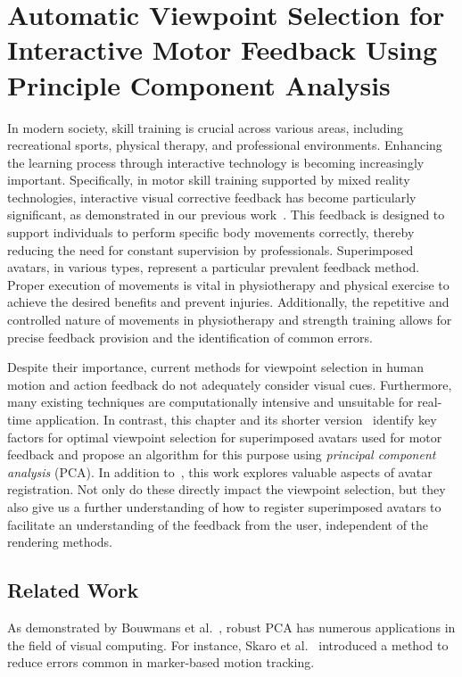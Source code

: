 
\chapter{Automatic Viewpoint Selection for Interactive Motor Feedback Using Principle Component Analysis\label{chap:viewpoint}}
In modern society, skill training is crucial across various areas, including recreational sports, physical therapy, and professional environments. Enhancing the learning process through interactive technology is becoming increasingly important. Specifically, in motor skill training supported by mixed reality technologies, interactive visual corrective feedback has become particularly significant, as demonstrated in our previous work~\cite{diller2022vcb}. This feedback is designed to support individuals to perform specific body movements correctly, thereby reducing the need for constant supervision by professionals. Superimposed avatars, in various types, represent a particular prevalent feedback method. Proper execution of movements is vital in physiotherapy and physical exercise to achieve the desired benefits and prevent injuries. Additionally, the repetitive and controlled nature of movements in physiotherapy and strength training allows for precise feedback provision and the identification of common errors.

Despite their importance, current methods for viewpoint selection in human motion and action feedback do not adequately consider visual cues. Furthermore, many existing techniques are computationally intensive and unsuitable for real-time application. In contrast, this chapter and its shorter version~\cite{diller2024automatic} identify key factors for optimal viewpoint selection for superimposed avatars used for motor feedback and propose an algorithm for this purpose using \emph{principal component analysis} (PCA). In addition to~\cite{diller2024automatic}, this work explores valuable aspects of avatar registration. Not only do these directly impact the viewpoint selection, but they also give us a further understanding of how to register superimposed avatars to facilitate an understanding of the feedback from the user, independent of the rendering methods.

\section{Related Work \label{sec:relView}}
As demonstrated by Bouwmans et al.~\cite{bouwmans2018arpca}, robust PCA has numerous applications in the field of visual computing. For instance, Skaro et al.~\cite{skaro2021knac} introduced a method to reduce errors common in marker-based motion tracking.

